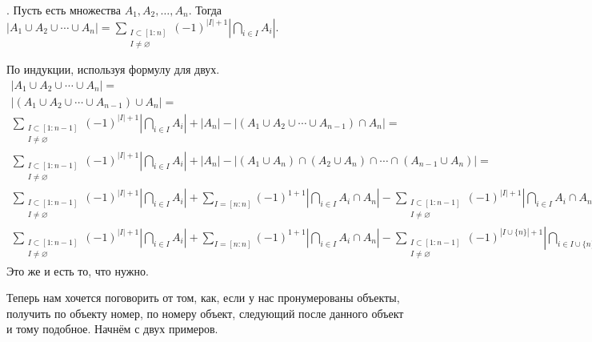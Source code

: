 \documentclass{article}
\begin{document}
\begin{itemize}
\begin{Example}
        \end{Example}
        \thm {}.
        Пусть есть множества $A_1,A_2,\ldots,A_n$. Тогда $|A_1\cup A_2\cup\cdots\cup A_n|=\sum\limits_{\substack{I\subset[1:n]\\I\neq\varnothing}}(-1)^{|I|+1}\left|\bigcap\limits_{i\in I}A_i\right|$.
        \begin{Proof}
            По индукции, используя формулу для двух.
            \[\begin{split}
                |A_1\cup A_2\cup\cdots\cup A_n|=\\
                |(A_1\cup A_2\cup\cdots\cup A_{n-1})\cup A_n|=\\
                \sum\limits_{\substack{I\subset[1:n-1]\\I\neq\varnothing}}(-1)^{|I|+1}\left|\bigcap\limits_{i\in I}A_i\right|+|A_n|-|(A_1\cup A_2\cup\cdots\cup A_{n-1})\cap A_n|=\\
                \sum\limits_{\substack{I\subset[1:n-1]\\I\neq\varnothing}}(-1)^{|I|+1}\left|\bigcap\limits_{i\in I}A_i\right|+|A_n|-|(A_1\cup A_n)\cap(A_2\cup A_n)\cap\cdots\cap (A_{n-1}\cup A_n)|=\\
                \sum\limits_{\substack{I\subset[1:n-1]\\I\neq\varnothing}}(-1)^{|I|+1}\left|\bigcap\limits_{i\in I}A_i\right|+\sum\limits_{I=[n:n]}(-1)^{1+1}\left|\bigcap\limits_{i\in I}A_i\cap A_n\right|-\sum\limits_{\substack{I\subset[1:n-1]\\I\neq\varnothing}}(-1)^{|I|+1}\left|\bigcap\limits_{i\in I}A_i\cap A_n\right|=\\
                \sum\limits_{\substack{I\subset[1:n-1]\\I\neq\varnothing}}(-1)^{|I|+1}\left|\bigcap\limits_{i\in I}A_i\right|+\sum\limits_{I=[n:n]}(-1)^{1+1}\left|\bigcap\limits_{i\in I}A_i\cap A_n\right|-\sum\limits_{\substack{I\subset[1:n-1]\\I\neq\varnothing}}(-1)^{|I\cup\{n\}|+1}\left|\bigcap\limits_{i\in I\cup\{n\}}A_i\right|
            \end{split}\]
            Это же и есть то, что нужно.
        \end{Proof}
        \begin{Comment}
            Теперь нам хочется поговорить от том, как, если у нас пронумерованы объекты, получить по объекту номер, по номеру объект, следующий после данного объект и тому подобное. Начнём с двух примеров.\\

\end{Comment}
\end{itemize}
\end{document}
